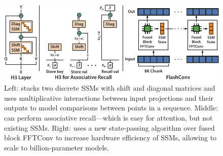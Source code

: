 \begin{figure}
    \centering
    \includegraphics[width=\textwidth]{figs/banner_pdf.pdf}
    \caption{\label{fig:banner}
    Left: \hthree stacks two discrete SSMs with shift and diagonal matrices and uses multiplicative interactions between input projections and their outputs to model comparisons between points in a sequence.
    Middle: \hthree can perform associative recall---which is easy for attention, but not existing SSMs.
    Right: \fastfft uses a new state-passing algorithm over fused block FFTConv to increase hardware efficiency of SSMs, allowing \hthree to scale to billion-parameter models.
    }
    \vspace{-1.25em}
\end{figure}